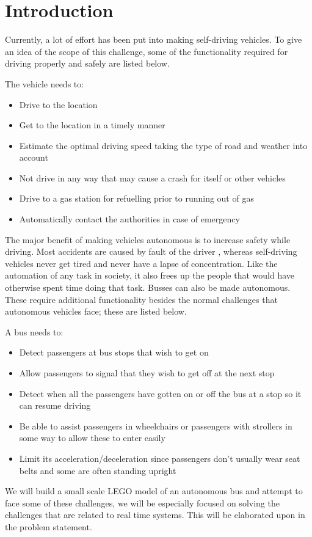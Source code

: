 \chapter{Introduction}

Currently, a lot of effort has been put into making self-driving vehicles. To give an idea of the scope of this challenge, some of the functionality required for driving properly and safely are listed below.

The vehicle needs to:
\begin{itemize}
\item Drive to the location
\item Get to the location in a timely manner
\item Estimate the optimal driving speed taking the type of road and weather into account
\item Not drive in any way that may cause a crash for itself or other vehicles
\item Drive to a gas station for refuelling prior to running out of gas
\item Automatically contact the authorities in case of emergency
\end{itemize}

The major benefit of making vehicles autonomous is to increase safety while driving. Most accidents are caused by fault of the driver \cite{baddriver}, whereas self-driving vehicles never get tired and never have a lapse of concentration. Like the automation of any task in society, it also frees up the people that would have otherwise spent time doing that task. Busses can also be made autonomous. These require additional functionality besides the normal challenges that autonomous vehicles face; these are listed below.

A bus needs to:
\begin{itemize}
\item Detect passengers at bus stops that wish to get on
\item Allow passengers to signal that they wish to get off at the next stop
\item Detect when all the passengers have gotten on or off the bus at a stop so it can resume driving
\item Be able to assist passengers in wheelchairs or passengers with strollers in some way to allow these to enter easily
\item Limit its acceleration/deceleration since passengers don't usually wear seat belts and some are often standing upright
\end{itemize}

We will build a small scale LEGO model of an autonomous bus and attempt to face some of these challenges, we will be especially focused on solving the challenges that are related to real time systems. This will be elaborated upon in the problem statement. 

